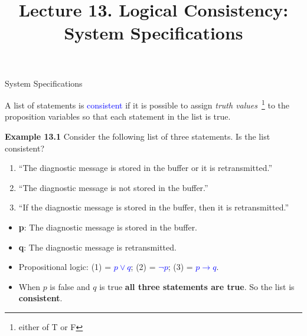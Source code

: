 \documentclass[aspectratio=169]{beamer}
\title{Lecture 13. Logical Consistency: System Specifications}
\date{ }
\providecommand{\Blue}[1]{\textcolor{blue}{#1}}
\begin{document}
\frame[plain]{\titlepage}

 

\begin{frame}[plain]{System Specifications}

 A list of statements is \Blue{consistent} if it is
    possible to assign \emph{truth values}~\footnote{either of T or F} 
    to the proposition  variables
     so that each statement in the list is true.
\medskip 

{\bf Example 13.1} Consider the following list of three statements. Is the list consistent?
   \begin{enumerate}
    \item ``The diagnostic message is stored in the buffer or it is retransmitted.''
    \item ``The diagnostic message is not stored in the buffer.''
    \item ``If the diagnostic message is stored in the buffer, then it is retransmitted.''
   \end{enumerate}
   \pause 
   
   \begin{itemize}
     \item {\bf p}: The diagnostic message is stored in the buffer.
     \item {\bf q}: The diagnostic message is retransmitted.
     \item Propositional logic: (1) = \Blue{$p\vee q$}; (2) = \Blue{$\neg p$};
         (3) = \Blue{$p\rightarrow q$}. \pause 
     \item When $p$ is false and $q$ is true {\bf all three statements are true}. 
        So the list  is {\bf consistent}.
   \end{itemize}


\end{frame}
\end{document}

